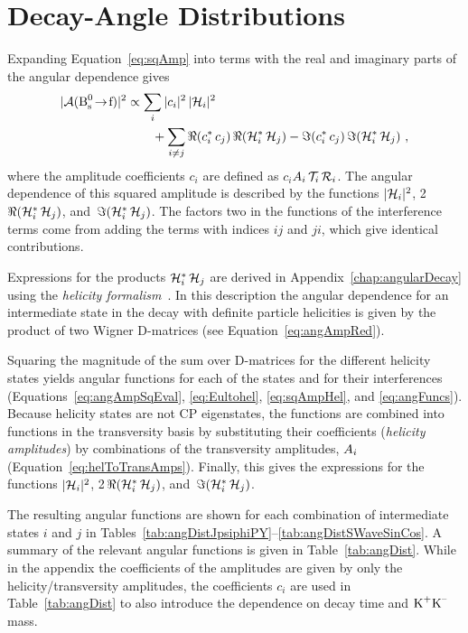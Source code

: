 \section{Decay-Angle Distributions}
\label{sec:pheno_angles}

Expanding Equation~\ref{eq:sqAmp} into terms with the real and imaginary parts of the angular dependence gives
\begin{equation}
  \label{eq:sqAmpExpand}
  \begin{aligned}
    |\mathcal{A}(\Bstof)|^2
      &\propto \sum_i |c_i|^2\, |\angAmp|^2 \\
        &\qquad + \sum_{i\neq j} \Re(c_i^*\,c_j)\, \Re(\angAmp^*\,\angAmp[j])
                               - \Im(c_i^*\,c_j)\, \Im(\angAmp^*\,\angAmp[j]) \ ,
  \end{aligned}
\end{equation}
where the amplitude coefficients $c_i$ are defined as $c_i$\textequiv$\Ai\,\timeAmp\,\mKKAmp$. The angular dependence of this squared
amplitude is described by the functions $|\angAmp|^\text{2}$, 2\,$\Re(\angAmp^*\,\angAmp[j])$, and \,$\Im(\angAmp^*\,\angAmp[j])$. The
factors two in the functions of the interference terms come from adding the terms with indices $ij$ and $ji$, which give identical
contributions.

Expressions for the products $\angAmp[i]^*\,\angAmp[j]$ are derived in Appendix~\ref{chap:angularDecay} using the \emph{helicity
formalism}~\cite{Jacob:1959at,Chung:1971ri,*Richman:1984gh,*Kutschke:1996}. In this description the angular dependence for an intermediate
state in the \BstoJpsiKK{} decay with definite particle helicities is given by the product of two Wigner D-matrices (see
Equation~\ref{eq:angAmpRed}).

Squaring the magnitude of the sum over D-matrices for the different helicity states yields angular functions for each of the states and for
their interferences (Equations~\ref{eq:angAmpSqEval}, \ref{eq:Eultohel}, \ref{eq:sqAmpHel}, and \ref{eq:angFuncs}). Because helicity states
are not CP eigenstates, the functions are combined into functions in the transversity basis by substituting their coefficients
(\emph{helicity amplitudes}) by combinations of the transversity amplitudes, $\Ai$ (Equation~\ref{eq:helToTransAmps}). Finally, this gives
the expressions for the functions $|\angAmp|^\text{2}$, 2\,$\Re(\angAmp^*\,\angAmp[j])$, and \,$\Im(\angAmp^*\,\angAmp[j])$.

The resulting angular functions are shown for each combination of intermediate states $i$ and $j$ in
Tables~\ref{tab:angDistJpsiphiPY}--\ref{tab:angDistSWaveSinCos}. A summary of the relevant angular functions is given in
Table~\ref{tab:angDist}. While in the appendix the coefficients of the amplitudes are given by only the helicity/transversity amplitudes,
the coefficients $c_i$ are used in Table~\ref{tab:angDist} to also introduce the dependence on decay time and $\KK$ mass.

